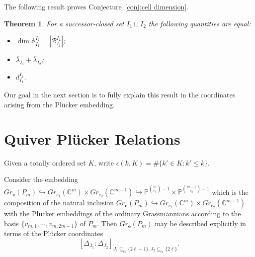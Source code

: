 \documentclass{amsart}
\newtheorem{theorem}{Theorem}
\numberwithin{equation}{section}
\renewcommand{\AA}{\mathbb{A}}
\newcommand{\CC}{\mathbb{C}}
\newcommand{\PP}{\mathbb{P}}
\newcommand{\bfe}{\mathbf{e}}
\newcommand{\cB}{\mathcal{B}}
\newcommand{\into}{\hookrightarrow}
\begin{document}
  The following result proves Conjecture~\ref{conj:cell dimension}.
  \begin{theorem}
    For a successor-closed set $I_1\sqcup I_2$ the following quantities are equal:
    \begin{itemize}
      \item $\dim\AA_{I_1}^{I_2}=|\cB_{I_1}^{I_2}|$;
      \item $\overline{\lambda}_{I_1}+\overline{\lambda}_{I_2}$;
      \item $d_{I_1}^{I_2}$.
    \end{itemize}
  \end{theorem}

  Our goal in the next section is to fully explain this result in the coordinates arising from the Pl\"ucker embedding.

\section{Quiver Pl\"ucker Relations}
  Given a totally ordered set $K$, write $\epsilon(k,K)=\#\{k'\in K: k'\le k\}$.

  Consider the embedding $Gr_\bfe(P_m)\into Gr_{e_1}(\CC^m)\times Gr_{e_2}(\CC^{m-1})\into \PP^{{m \choose e_1} - 1}\times \PP^{{m-1 \choose e_2} - 1}$ which is the composition of the natural inclusion $Gr_\bfe(P_m)\into Gr_{e_1}(\CC^m)\times Gr_{e_2}(\CC^{m-1})$ with the Pl\"ucker embeddings of the ordinary Grassmannians according to the basis $\{v_{m,1},\cdots,v_{m,2m-1}\}$ of $P_m$.
  Then $Gr_\bfe(P_m)$ may be described explicitly in terms of the Pl\"ucker coordinates
  \[[\Delta_{J_1}:\Delta_{J_2}]_{J_1\subseteq_{e_1} \{2\ell-1\}, J_2\subseteq_{e_2} \{2\ell\}}.\]
\end{document}
